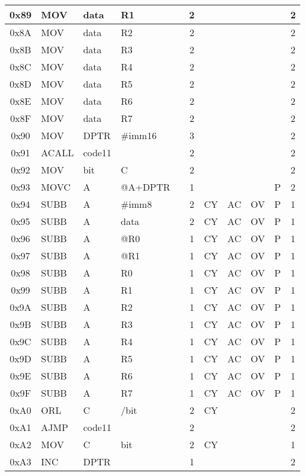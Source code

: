 \documentclass[a4paper,twoside,12pt]{book}
\begin{document}
{\begin{longtable}{|c|l|lll|c|llll|c|}
		0x89	& MOV	& data	& R1	&	& 2	&	&	&	&	& 2	\\\hline
		0x8A	& MOV	& data	& R2	&	& 2	&	&	&	&	& 2	\\\hline
		0x8B	& MOV	& data	& R3	&	& 2	&	&	&	&	& 2	\\\hline
		0x8C	& MOV	& data	& R4	&	& 2	&	&	&	&	& 2	\\\hline
		0x8D	& MOV	& data	& R5	&	& 2	&	&	&	&	& 2	\\\hline
		0x8E	& MOV	& data	& R6	&	& 2	&	&	&	&	& 2	\\\hline
		0x8F	& MOV	& data	& R7	&	& 2	&	&	&	&	& 2	\\\hline
		0x90	& MOV	& DPTR	&\#imm16&	& 3	&	&	&	&	& 2	\\\hline
		0x91	& ACALL	& code11&	&	& 2	&	&	&	&	& 2	\\\hline
		0x92	& MOV	& bit	& C	&	& 2	&	&	&	&	& 2	\\\hline
		0x93	& MOVC	& A	&@A+DPTR&	& 1	&	&	&	& P	& 2	\\\hline
		0x94	& SUBB	& A	& \#imm8&	& 2	& CY	& AC	& OV	& P	& 1	\\\hline
		0x95	& SUBB	& A	& data	&	& 2	& CY	& AC	& OV	& P	& 1	\\\hline
		0x96	& SUBB	& A	& @R0	&	& 1	& CY	& AC	& OV	& P	& 1	\\\hline
		0x97	& SUBB	& A	& @R1	&	& 1	& CY	& AC	& OV	& P	& 1	\\\hline
		0x98	& SUBB	& A	& R0	&	& 1	& CY	& AC	& OV	& P	& 1	\\\hline
		0x99	& SUBB	& A	& R1	&	& 1	& CY	& AC	& OV	& P	& 1	\\\hline
		0x9A	& SUBB	& A	& R2	&	& 1	& CY	& AC	& OV	& P	& 1	\\\hline
		0x9B	& SUBB	& A	& R3	&	& 1	& CY	& AC	& OV	& P	& 1	\\\hline
		0x9C	& SUBB	& A	& R4	&	& 1	& CY	& AC	& OV	& P	& 1	\\\hline
		0x9D	& SUBB	& A	& R5	&	& 1	& CY	& AC	& OV	& P	& 1	\\\hline
		0x9E	& SUBB	& A	& R6	&	& 1	& CY	& AC	& OV	& P	& 1	\\\hline
		0x9F	& SUBB	& A	& R7	&	& 1	& CY	& AC	& OV	& P	& 1	\\\hline
		0xA0	& ORL	& C	& /bit	&	& 2	& CY	&	&	&	& 2	\\\hline
		0xA1	& AJMP	& code11&	&	& 2	&	&	&	&	& 2	\\\hline
		0xA2	& MOV	& C	& bit	&	& 2	& CY	&	&	&	& 1	\\\hline
		0xA3	& INC	& DPTR	&	&	& 1	&	&	&	&	& 2	\\\hline

\end{longtable}}
\end{document}
